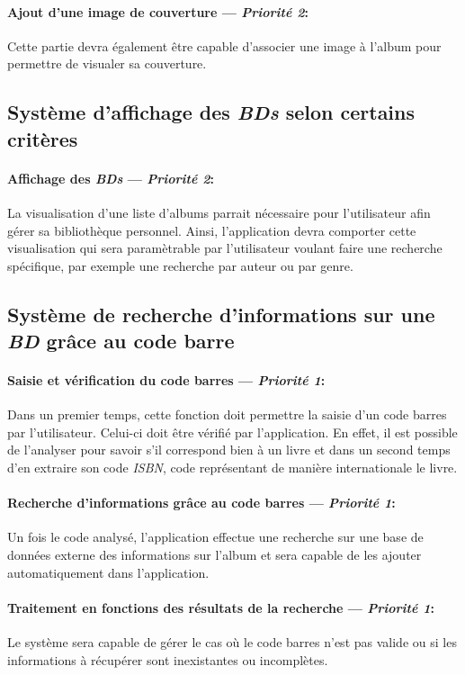 \paragraph{Ajout d'une image de couverture ---  \textit{Priorité 2}:}  
Cette partie devra également être capable d'associer une image à l'album pour permettre de visualer sa couverture.

\subsection{Système d'affichage des \emph{BDs} selon certains critères}

\paragraph{Affichage des \emph{BDs} ---  \textit{Priorité 2}:}

La visualisation d'une liste d'albums parrait nécessaire pour l'utilisateur afin gérer sa bibliothèque personnel. Ainsi, l'application devra comporter cette visualisation qui sera paramètrable par l'utilisateur voulant faire une recherche spécifique, par exemple une recherche par auteur ou par genre.

\subsection{Système de recherche d'informations sur une \emph{BD}  grâce au code barre}

\paragraph{Saisie et vérification du code barres ---  \textit{Priorité 1}:}
Dans un premier temps, cette fonction doit permettre la saisie d'un code barres par l'utilisateur. 
Celui-ci doit être vérifié par l'application. En effet, il est possible de l'analyser pour savoir s'il correspond bien à un livre et dans un second temps d'en extraire son code \emph{ISBN}, code représentant de manière internationale le livre.
\paragraph{Recherche d'informations grâce au code barres ---  \textit{Priorité 1}:}  
Un fois le code analysé, l'application effectue une recherche sur une base de données externe des informations sur l'album et sera capable de les ajouter automatiquement dans l'application.
\paragraph{Traitement en fonctions des résultats de la recherche ---  \textit{Priorité 1}:}  
Le système sera capable de gérer le cas où le code barres n'est pas valide ou si les informations à récupérer sont inexistantes ou incomplètes.

